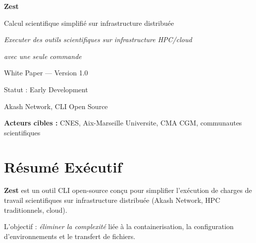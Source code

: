 \documentclass[11pt,a4paper]{article}
\newcommand{\highlight}[1]{\textbf{\color{darkblue}#1}}
\begin{document}
	
	\thispagestyle{empty}
	\vspace*{2cm}
	
	\begin{center}
		{\Huge\color{darkblue}\textbf{Zest}}
		\vspace{0.5cm}
		
		{\Large\color{darkgray}Calcul scientifique simplifié sur infrastructure distribuée}
		\vspace{2cm}
		
		{\large\color{darkgray}\textit{Executer des outils scientifiques sur infrastructure HPC/cloud}}
		
		{\large\color{darkgray}\textit{avec une seule commande}}
		\vspace{3cm}
		
		{\large\color{darkgray}White Paper --- Version 1.0}
		\vspace{0.5cm}
		
		{\small\color{darkgray}Statut : Early Development}
		\vspace{3cm}
		
		{\small\color{darkgray}Akash Network, CLI Open Source}
	\end{center}
	
	\vfill
	
	\noindent\color{darkgray}\small
	\textbf{Acteurs cibles :} CNES, Aix-Marseille Universite, CMA CGM, communautes scientifiques
	
	\newpage
	
	\tableofcontents
	
	\newpage
	
	\section{Résumé Exécutif}
	
	\highlight{Zest} est un outil CLI open-source conçu pour simplifier l'exécution de charges de travail scientifiques sur infrastructure distribuée (Akash Network, HPC traditionnels, cloud).
	
	L'objectif : \textit{éliminer la complexité} liée à la containerisation, la configuration d'environnements et le transfert de fichiers.
	
\end{document}
